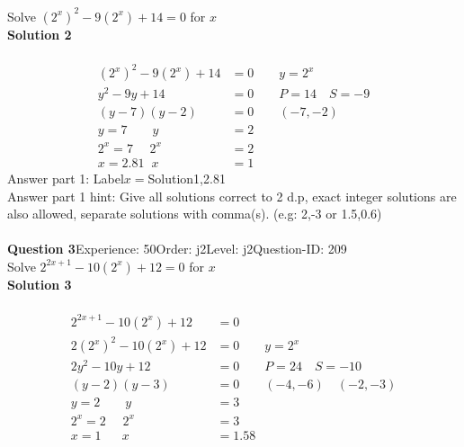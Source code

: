 \documentclass{article}
\begin{document}
Solve $(2^x)^2-9(2^x)+14=0$ for $x$\\[4pt]
\noindent\textbf{Solution 2}\\[2pt]
\\[-35pt]\begin{align*}
(2^x)^2-9(2^x)+14&=0\qquad y=2^x\\[2pt]
y^2-9y+14&=0\qquad P=14 \quad S=-9\\[2pt]
(y-7)(y-2)&=0\qquad (-7,-2)\\[2pt]
y=7 \qquad y&=2\\[2pt]
2^x=7\hspace{16pt} 2^x&=2\\[2pt]
x=2.81 \hspace{7pt} x&=1
\end{align*}
Answer part 1: \hspace{10pt}Label\hspace{10pt}$x=$\hspace{10pt}Solution\hspace{10pt}1,2.81\\
Answer part 1 hint: \hspace{15pt} Give all solutions correct to 2 d.p, exact integer solutions are also allowed, separate solutions with comma(s). (e.g: 2,-3 or 1.5,0.6)\\
\\[4pt]
\noindent\textbf{Question 3}\hspace{20pt}Experience: 50\hspace{20pt}Order: j2\hspace{20pt}Level: j2\hspace{20pt}Question-ID: 209\\[2pt]
Solve $2^{2x+1}-10(2^x)+12=0$ for $x$\\[4pt]
\noindent\textbf{Solution 3}\\[2pt]
\\[-35pt]\begin{align*}
2^{2x+1}-10(2^x)+12&=0\\[2pt]
2(2^x)^2-10(2^x)+12&=0\qquad y=2^x\\[2pt]
2y^2-10y+12&=0\qquad P=24 \quad S=-10\\[2pt]
(y-2)(y-3)&=0\qquad (-4,-6)\quad (-2,-3)\\[2pt]
y=2 \qquad y&=3\\[2pt]
2^x=2\hspace{16pt} 2^x&=3\\[2pt]
x=1 \hspace{20pt} x&=1.58
\end{align*}
\end{document}
